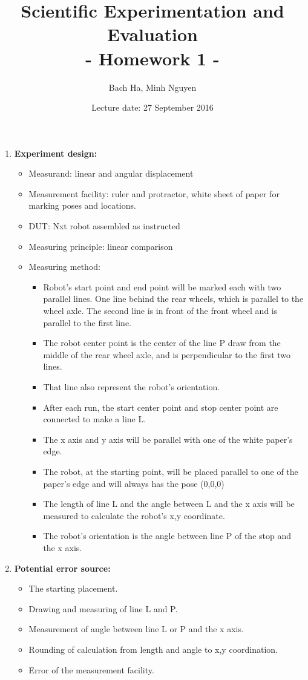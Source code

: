\documentclass[a4paper, 12pt]{article}
\title{Scientific Experimentation and Evaluation \\
				- Homework 1 -}
\author{Bach Ha, Minh Nguyen}
\date{Lecture date: 27 September 2016}
\begin{document}
\maketitle


\begin{enumerate}
    \item \textbf{Experiment design:}
    \begin{itemize}
        \item Measurand: linear and angular displacement
        \item Measurement facility: ruler and protractor, white sheet of paper for marking poses and locations.
        \item DUT: Nxt robot assembled as instructed
        \item Measuring principle: linear comparison
        \item Measuring method:
            \begin{itemize}
                \item Robot's start point and end point will be marked each with two parallel lines. One line behind the rear wheels, which is parallel to the wheel axle. The second line is in front of the front wheel and is parallel to the first line.
                \item The robot center point is the center of the line P draw from the middle of the rear wheel axle, and is perpendicular to the first two lines.
                \item That line also represent the robot's orientation.
                \item After each run, the start center point and stop center point are connected to make a line L.
                \item The x axis and y axis will be parallel with one of the white paper's edge.
                \item The robot, at the starting point, will be placed parallel to one of the paper's edge and will always has the pose (0,0,0)
                \item The length of line L and the angle between L and the x axis will be measured to calculate the robot's x,y coordinate.
                \item The robot's orientation is the angle between line P of the stop and the x axis.
            \end{itemize}
    \end{itemize}

    \item \textbf{Potential error source:}
    \begin{itemize}
        \item The starting placement.
        \item Drawing and measuring of line L and P.
        \item Measurement of angle between line L or P and the x axis.
        \item Rounding of calculation from length and angle to x,y coordination.
        \item Error of the measurement facility.
    \end{itemize}

\end{enumerate}
\end{document}

